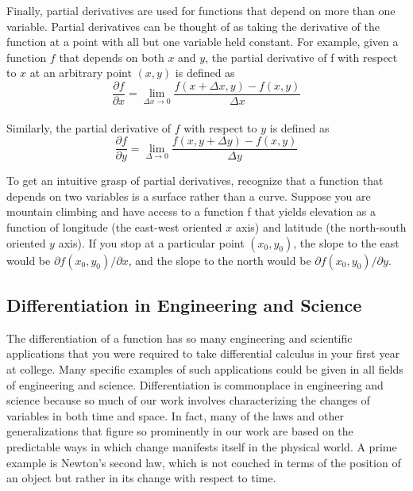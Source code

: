 \documentclass[../main.tex]{subfiles}
\begin{document}
Finally, partial derivatives are used for functions that depend on more than one variable.
Partial derivatives can be thought of as taking the derivative of the function at a point with
all but one variable held constant. For example, given a function $f$ that depends on both $x$
and $y$, the partial derivative of f with respect to $x$ at an arbitrary point $(x, y)$ is defined as
\begin{equation}
	\tag{21.9}
	\dfrac{\partial f}{\partial x} = \lim \limits_{\Delta x \longrightarrow 0} \dfrac{f(x+ \Delta x, y) - f(x,y)}{\Delta x}
\end{equation}\\
Similarly, the partial derivative of $f$ with respect to $y$ is defined as
\begin{equation}
	\tag{21.10}
	\dfrac{\partial f}{\partial y} = \lim \limits_{\Delta \longrightarrow 0} \dfrac{f(x,y + \Delta y) - f(x,y)}{\Delta y}
\end{equation}

To get an intuitive grasp of partial derivatives, recognize that a function that depends on
two variables is a surface rather than a curve. Suppose you are mountain climbing and have
access to a function f that yields elevation as a function of longitude (the east-west oriented $x$ axis) and latitude (the north-south oriented $y$ axis). If you stop at a particular point $(x_{0}, y_{0})$,
the slope to the east would be $\partial f(x_{0},y_{0})/ \partial x$, and the slope to the north would be $\partial f(x_{0}, y_{0})/ \partial y$.

\subsection{Differentiation in Engineering and Science}
The differentiation of a function has so many engineering and scientific applications that
you were required to take differential calculus in your first year at college. Many specific examples of such applications could be given in all fields of engineering and science. Differentiation is commonplace in engineering and science because so much of our work involves
characterizing the changes of variables in both time and space. In fact, many of the laws and
other generalizations that figure so prominently in our work are based on the predictable
ways in which change manifests itself in the physical world. A prime example is Newton's
second law, which is not couched in terms of the position of an object but rather in its change
with respect to time.
\end{document}
